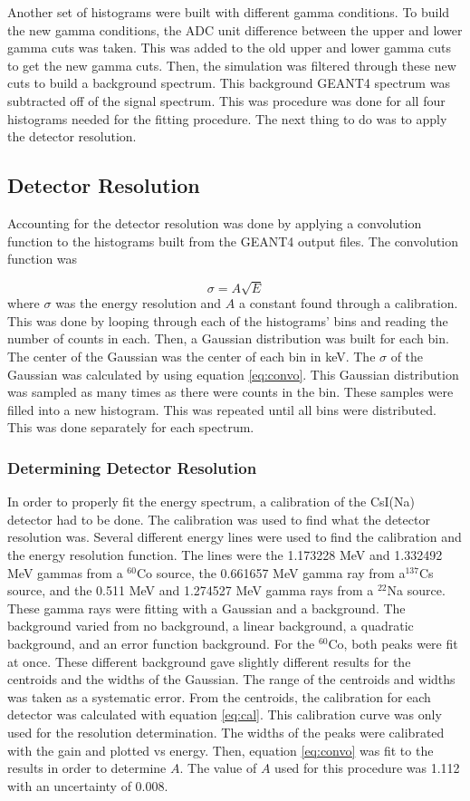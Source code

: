 \documentclass[../MaxHughesThesis.tex]{subfiles}
\begin{document}
Another set of histograms were built with different gamma conditions.
To build the new gamma conditions, the ADC unit difference between the upper and lower gamma cuts was taken.
This was added to the old upper and lower gamma cuts to get the new gamma cuts.
Then, the simulation was filtered through these new cuts to build a background spectrum.
This background GEANT4 spectrum was subtracted off of the signal spectrum.
This was procedure was done for all four histograms needed for the fitting procedure.
The next thing to do was to apply the detector resolution.

\subsection{Detector Resolution}
\label{sec:convolution}
Accounting for the detector resolution was done by applying a convolution function to the histograms built from the GEANT4 output files.
The convolution function was

\begin{equation}
	\sigma = A\sqrt{E}
	\label{eq:convo}
\end{equation}
where $\sigma$ was the energy resolution and $A$ a constant found through a calibration.
This was done by looping through each of the histograms' bins and reading the number of counts in each.
Then, a Gaussian distribution was built for each bin.
The center of the Gaussian was the center of each bin in keV.
The $\sigma$ of the Gaussian was calculated by using equation \ref{eq:convo}.
This Gaussian distribution was sampled as many times as there were counts in the bin.
These samples were filled into a new histogram.
This was repeated until all bins were distributed.
This was done separately for each spectrum. 

\subsubsection{Determining Detector Resolution}
In order to properly fit the energy spectrum, a calibration of the CsI(Na) detector had to be done.
The calibration was used to find what the detector resolution was.
Several different energy lines were used to find the calibration and the energy resolution function.
The lines were the 1.173228 MeV and 1.332492 MeV gammas from a $^{60}$Co source, the 0.661657 MeV gamma ray from a$^{137}$Cs source, and the 0.511 MeV and 1.274527 MeV gamma rays from a $^{22}$Na source.
These gamma rays were fitting with a Gaussian and a background.
The background varied from no background, a linear background, a quadratic background, and an error function background.
For the $^{60}$Co, both peaks were fit at once.
These different background gave slightly different results for the centroids and the widths of the Gaussian.
The range of the centroids and widths was taken as a systematic error.
From the centroids, the calibration for each detector was calculated with equation \ref{eq:cal}. 
This calibration curve was only used for the resolution determination.
The widths of the peaks were calibrated with the gain and plotted vs energy.
Then, equation \ref{eq:convo} was fit to the results in order to determine $A$.
The value of $A$ used for this procedure was 1.112 with an uncertainty of 0.008.
\end{document}
